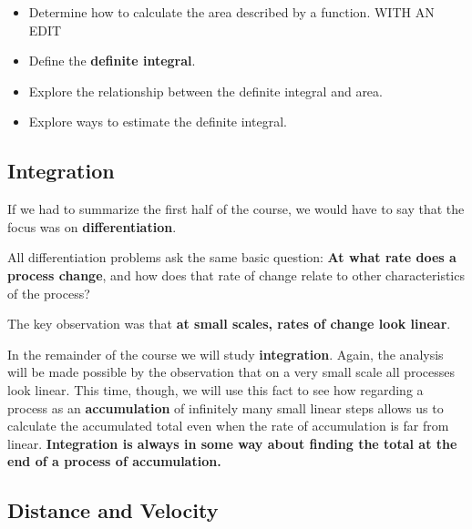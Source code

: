 



\setfont
\pagestyle{fancy}
\renewcommand{\Week}{7 }
\renewcommand{\WeekTitle}{\WeekTitleSeven }

\fancyhead[LE,RO]{Week \Week}  %
\fancyfoot{}
\sectionbox{Week \#\Week: \WeekTitle}

\vspace{5mm}
\noindent

\goals
\begin{itemize}
\item Determine how to calculate the area described by a function. WITH AN EDIT
\item Define the {\bf definite integral}.
\item Explore the relationship between the definite integral and area.
\item Explore ways to estimate the definite integral.
\end{itemize}

\newpage

\subsection*{Integration} 
If we had to summarize the first half of
the course, we would have to say that the focus was on {\bf
  differentiation}. 

All differentiation problems ask the same basic question: {\bf At what
  rate does a process change}, and how does that rate of change relate
to other characteristics of the process?

The key observation was that {\bf at small scales, rates of change look linear}.

\newpage

In the remainder of the course we will study {\bf integration}.
Again, the analysis will be made possible by the observation that on a very
small scale all processes look linear.  This time, though, we will use
this fact to see how regarding a process as an {\bf accumulation} of
infinitely many small linear steps allows us to calculate the
accumulated total even when the rate of accumulation is far from
linear.  {\bf Integration is always in some way about finding the
  total at the end of a process of accumulation.}

\newpage


 \subsection*{Distance and Velocity}

